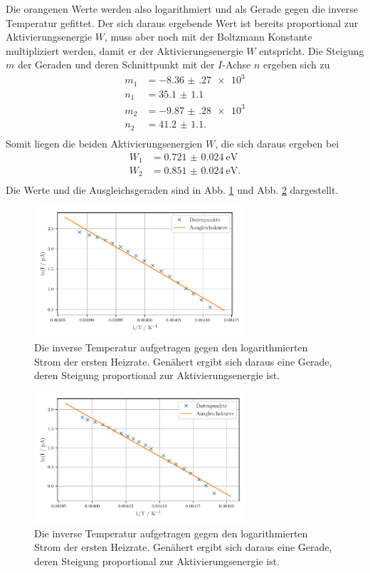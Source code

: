 Die orangenen Werte werden also logarithmiert und als Gerade gegen die inverse Temperatur gefittet. Der sich daraus ergebende Wert ist bereits proportional zur Aktivierungsenergie $W$, muss aber noch mit der Boltzmann Konstante multipliziert werden, damit er der Aktivierungsenergie $W$ entspricht. Die Steigung $m$ der Geraden und deren Schnittpunkt mit der $I$-Achse $n$ ergeben sich zu 
\begin{align*}
     m_{1} &= \num{-8.36(27)e3} \\
     n_{1} &= \num{35.1(11)} \\
     m_{2} &= \num{-9.87(28)e3} \\
     n_{2} &= \num{41.2(11)}. \\
\end{align*}
Somit liegen die beiden Aktivierungsenergien $W$, die sich daraus ergeben bei 
\begin{align*}
    W_{1} &= \SI{0.721(24)}{\electronvolt} \\
    W_{2} &= \SI{0.851(24)}{\electronvolt}. \\
\end{align*}
Die Werte und die Ausgleichsgeraden sind in Abb. \ref{abb:anlauf1} und Abb. \ref{abb:anlauf2} dargestellt. 

\begin{figure}
    \centering
    \includegraphics[width=0.7\textwidth]{figures/anlauf1.pdf}
    \caption{Die inverse Temperatur aufgetragen gegen den logarithmierten Strom der ersten Heizrate. Genähert ergibt sich daraus eine Gerade, deren Steigung proportional zur Aktivierungsenergie ist.}
    \label{abb:anlauf1}
\end{figure}

\begin{figure}
    \centering
    \includegraphics[width=0.7\textwidth]{figures/anlauf2.pdf}
    \caption{Die inverse Temperatur aufgetragen gegen den logarithmierten Strom der ersten Heizrate. Genähert ergibt sich daraus eine Gerade, deren Steigung proportional zur Aktivierungsenergie ist.}
    \label{abb:anlauf2}
\end{figure}

